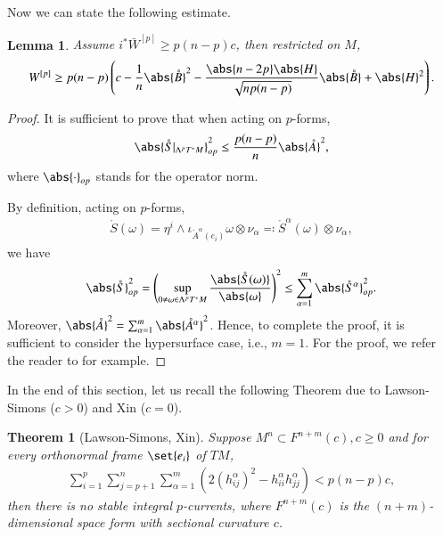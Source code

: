 \documentclass[12pt]{amsart}
\theoremstyle{plain}
\newtheorem{known}{Theorem}
\newtheorem{lem}[lem]{Lemma}
\theoremstyle{remark}
\theoremstyle{definition}
\numberwithin{equation}{section}
\begin{document}
Now we can state the following estimate.
\begin{lem}\label{lem:W3}Assume $i^*\bar W^{[p]}\geq p(n-p)c$, then restricted on $M$,
\begin{align*}
W^{[p]}\geq p(n-p)\left(c-\dfrac{1}{n}\abs{\mathring{B}}^2-\dfrac{\abs{n-2p}\abs{H}}{\sqrt{np(n-p)}}\abs{\mathring{B}}+\abs{H}^2\right).
\end{align*}
\end{lem}
\begin{proof}It is sufficient to prove that when acting on $p$-forms,
\begin{align*}
\abs{\mathring{S}\vert_{\Lambda^pT^*M}}^2_{op}\leq\dfrac{p(n-p)}{n}\abs{\mathring{A}}^2,
\end{align*}
where $\abs{\cdot}_{op}$ stands for the operator norm.

By definition, acting on $p$-forms,
\begin{align*}
\mathring{S}(\omega)=\eta^i\wedge\iota_{\mathring{A}^{\alpha}(e_i)}\omega\otimes\nu_{\alpha}\eqqcolon\mathring{S}^{\alpha}(\omega)\otimes\nu_{\alpha},
\end{align*}
we have
\begin{align*}
\abs{\mathring{S}}_{op}^2=\left(\sup_{0\neq\omega\in\Lambda^pT^*M}\dfrac{\abs{\mathring{S}(\omega)}}{\abs{\omega}}\right)^2\leq\sum_{\alpha=1}^m\abs{\mathring{S}^{\alpha}}_{op}^2.
\end{align*}
Moreover, $\abs{\mathring{A}}^2=\sum_{\alpha=1}^m\abs{\mathring{A}^{\alpha}}^2$. Hence, to complete the proof, it is sufficient to consider the hypersurface case, i.e., $m=1$.
For the proof, we refer the reader to \cite{RauSav11} for example.
\end{proof}

In the end of this section, let us recall the following Theorem due to Lawson-Simons \cite{LawSim73} ($c>0$) and Xin \cite{Xin84} ($c=0$).
\begin{known}[Lawson-Simons, Xin]Suppose $M^n\subset F^{n+m}(c), c\geq0$ and for every orthonormal frame $\set{e_i}$ of $TM$,
\begin{align}\label{eq:L-S}
\sum_{i=1}^p\sum_{j=p+1}^n\sum_{\alpha=1}^m\left(2\left(h_{ij}^{\alpha}\right)^2-h_{ii}^{\alpha}h_{jj}^{\alpha}\right)<p(n-p)c,
\end{align}
then there is  no stable integral $p$-currents, where $F^{n+m}(c)$ is the $(n+m)$-dimensional space form with sectional curvature $c$.
\end{known}
\end{document}

